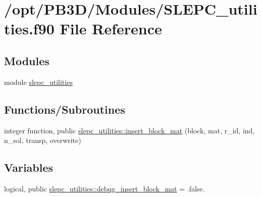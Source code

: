 \hypertarget{SLEPC__utilities_8f90}{}\section{/opt/\+P\+B3\+D/\+Modules/\+S\+L\+E\+P\+C\+\_\+utilities.f90 File Reference}
\label{SLEPC__utilities_8f90}
\subsection*{Modules}
\begin{DoxyCompactItemize}
\item 
module \hyperlink{namespaceslepc__utilities}{slepc\+\_\+utilities}
\end{DoxyCompactItemize}
\subsection*{Functions/\+Subroutines}
\begin{DoxyCompactItemize}
\item 
integer function, public \hyperlink{namespaceslepc__utilities_ae6568f825f3fa8a6e3d45f67f3daf412}{slepc\+\_\+utilities\+::insert\+\_\+block\+\_\+mat} (block, mat, r\+\_\+id, ind, n\+\_\+sol, transp, overwrite)
\end{DoxyCompactItemize}
\subsection*{Variables}
\begin{DoxyCompactItemize}
\item 
logical, public \hyperlink{namespaceslepc__utilities_a5cb92553633cb22ff703286298862ac7}{slepc\+\_\+utilities\+::debug\+\_\+insert\+\_\+block\+\_\+mat} = .false.
\end{DoxyCompactItemize}

